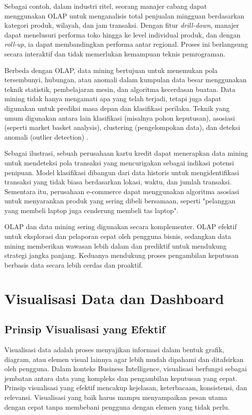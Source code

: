 Sebagai contoh, dalam industri ritel, seorang manajer cabang dapat menggunakan OLAP untuk menganalisis total penjualan mingguan berdasarkan kategori produk, wilayah, dan jam transaksi. Dengan fitur \textit{drill-down}, manajer dapat menelusuri performa toko hingga ke level individual produk, dan dengan \textit{roll-up}, ia dapat membandingkan performa antar regional. Proses ini berlangsung secara interaktif dan tidak memerlukan kemampuan teknis pemrograman.

Berbeda dengan OLAP, data mining bertujuan untuk menemukan pola tersembunyi, hubungan, atau anomali dalam kumpulan data besar menggunakan teknik statistik, pembelajaran mesin, dan algoritma kecerdasan buatan. Data mining tidak hanya mengamati apa yang telah terjadi, tetapi juga dapat digunakan untuk prediksi masa depan dan klasifikasi perilaku. Teknik yang umum digunakan antara lain klasifikasi (misalnya pohon keputusan), asosiasi (seperti market basket analysis), clustering (pengelompokan data), dan deteksi anomali (outlier detection) \cite{han2011data}.

Sebagai ilustrasi, sebuah perusahaan kartu kredit dapat menerapkan data mining untuk mendeteksi pola transaksi yang mencurigakan sebagai indikasi potensi penipuan. Model klasifikasi dibangun dari data historis untuk mengidentifikasi transaksi yang tidak biasa berdasarkan lokasi, waktu, dan jumlah transaksi. Sementara itu, perusahaan e-commerce dapat menggunakan algoritma asosiasi untuk menyarankan produk yang sering dibeli bersamaan, seperti "pelanggan yang membeli laptop juga cenderung membeli tas laptop".

OLAP dan data mining sering digunakan secara komplementer. OLAP efektif untuk eksplorasi dan pelaporan cepat oleh pengguna bisnis, sedangkan data mining memberikan wawasan lebih dalam dan prediktif untuk mendukung strategi jangka panjang. Keduanya mendukung proses pengambilan keputusan berbasis data secara lebih cerdas dan proaktif.


\section{Visualisasi Data dan Dashboard}

\subsection{Prinsip Visualisasi yang Efektif}

Visualisasi data adalah proses menyajikan informasi dalam bentuk grafik, diagram, atau elemen visual lainnya agar lebih mudah dipahami dan ditafsirkan oleh pengguna. Dalam konteks Business Intelligence, visualisasi berfungsi sebagai jembatan antara data yang kompleks dan pengambilan keputusan yang cepat. Prinsip visualisasi yang efektif mencakup kejelasan, keterbacaan, konsistensi, dan relevansi. Visualisasi yang baik harus mampu menyampaikan pesan utama dengan cepat tanpa membebani pengguna dengan elemen yang tidak perlu.

